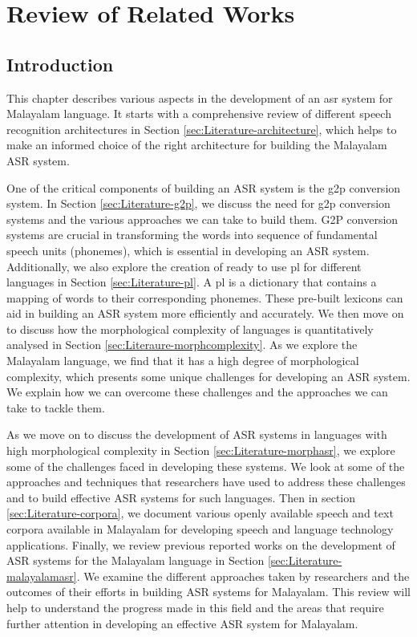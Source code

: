 \chapter{Review of Related Works}
\label{Ch:Literature} %
\graphicspath{{Figures/chapter2-Lit/}}

\section{Introduction}


This chapter describes various aspects in the  development of an \gls{asr} system for Malayalam language. It starts with a comprehensive review of different speech recognition architectures in Section \ref{sec:Literature-architecture}, which helps to make an informed choice of the right architecture for building the Malayalam ASR system. 

One of the critical components of building an ASR system is the \gls{g2p} conversion system. In Section \ref{sec:Literature-g2p}, we discuss the need for \gls{g2p} conversion systems and the various approaches we can take to build them. G2P conversion systems are crucial in transforming the words into sequence of fundamental speech units (phonemes), which is essential in developing an ASR system. Additionally, we also explore the creation of ready to use \acrfull{pl} for different languages in Section \ref{sec:Literature-pl}. A \gls{pl} is a dictionary that contains a mapping of words to their corresponding phonemes. These pre-built lexicons can aid in building an ASR system more efficiently and accurately. We then move on to discuss how the morphological complexity of languages is quantitatively analysed in Section \ref{sec:Literaure-morphcomplexity}. As we explore the Malayalam language, we find that it has a high degree of morphological complexity, which presents some unique challenges for developing an ASR system. We explain how we can overcome these challenges and the approaches we can take to tackle them.

As we move on to discuss the development of ASR systems in languages with high morphological complexity in Section \ref{sec:Literature-morphasr}, we explore some of the challenges faced in developing these systems. We look at some of the approaches and techniques that researchers have used to address these challenges and to build effective ASR systems for such languages. Then in section \ref{sec:Literature-corpora}, we document various openly available speech and text corpora available in Malayalam for developing speech and language technology applications. Finally, we review previous reported works on the development of ASR systems for the Malayalam language in Section \ref{sec:Literature-malayalamasr}. We examine the different approaches taken by researchers and the outcomes of their efforts in building ASR systems for Malayalam. This review will help to understand the progress made in this field and the areas that require further attention in developing an effective ASR system for Malayalam.


